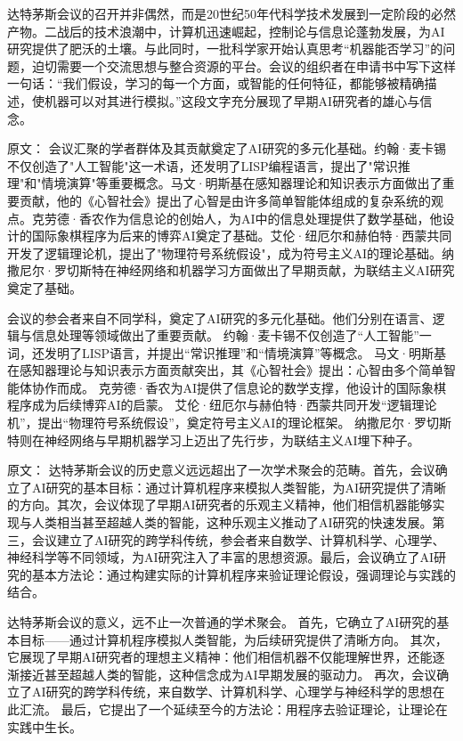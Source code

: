 达特茅斯会议的召开并非偶然，而是20世纪50年代科学技术发展到一定阶段的必然产物。二战后的技术浪潮中，计算机迅速崛起，控制论与信息论蓬勃发展，为AI研究提供了肥沃的土壤。与此同时，一批科学家开始认真思考“机器能否学习”的问题，迫切需要一个交流思想与整合资源的平台。会议的组织者在申请书中写下这样一句话：“我们假设，学习的每一个方面，或智能的任何特征，都能够被精确描述，使机器可以对其进行模拟。”这段文字充分展现了早期AI研究者的雄心与信念。

原文：
会议汇聚的学者群体及其贡献奠定了AI研究的多元化基础。约翰·麦卡锡不仅创造了"人工智能"这一术语，还发明了LISP编程语言，提出了"常识推理"和"情境演算"等重要概念。马文·明斯基在感知器理论和知识表示方面做出了重要贡献，他的《心智社会》提出了心智是由许多简单智能体组成的复杂系统的观点。克劳德·香农作为信息论的创始人，为AI中的信息处理提供了数学基础，他设计的国际象棋程序为后来的博弈AI奠定了基础。艾伦·纽厄尔和赫伯特·西蒙共同开发了逻辑理论机，提出了"物理符号系统假设"，成为符号主义AI的理论基础。纳撒尼尔·罗切斯特在神经网络和机器学习方面做出了早期贡献，为联结主义AI研究奠定了基础。

会议的参会者来自不同学科，奠定了AI研究的多元化基础。他们分别在语言、逻辑与信息处理等领域做出了重要贡献。  
约翰·麦卡锡不仅创造了“人工智能”一词，还发明了LISP语言，并提出“常识推理”和“情境演算”等概念。  
马文·明斯基在感知器理论与知识表示方面贡献突出，其《心智社会》提出：心智由多个简单智能体协作而成。  
克劳德·香农为AI提供了信息论的数学支撑，他设计的国际象棋程序成为后续博弈AI的启蒙。  
艾伦·纽厄尔与赫伯特·西蒙共同开发“逻辑理论机”，提出“物理符号系统假设”，奠定符号主义AI的理论框架。  
纳撒尼尔·罗切斯特则在神经网络与早期机器学习上迈出了先行步，为联结主义AI埋下种子。

原文：
达特茅斯会议的历史意义远远超出了一次学术聚会的范畴。首先，会议确立了AI研究的基本目标：通过计算机程序来模拟人类智能，为AI研究提供了清晰的方向。其次，会议体现了早期AI研究者的乐观主义精神，他们相信机器能够实现与人类相当甚至超越人类的智能，这种乐观主义推动了AI研究的快速发展。第三，会议建立了AI研究的跨学科传统，参会者来自数学、计算机科学、心理学、神经科学等不同领域，为AI研究注入了丰富的思想资源。最后，会议确立了AI研究的基本方法论：通过构建实际的计算机程序来验证理论假设，强调理论与实践的结合。

达特茅斯会议的意义，远不止一次普通的学术聚会。  
首先，它确立了AI研究的基本目标——通过计算机程序模拟人类智能，为后续研究提供了清晰方向。  
其次，它展现了早期AI研究者的理想主义精神：他们相信机器不仅能理解世界，还能逐渐接近甚至超越人类的智能，这种信念成为AI早期发展的驱动力。  
再次，会议确立了AI研究的跨学科传统，来自数学、计算机科学、心理学与神经科学的思想在此汇流。  
最后，它提出了一个延续至今的方法论：用程序去验证理论，让理论在实践中生长。

